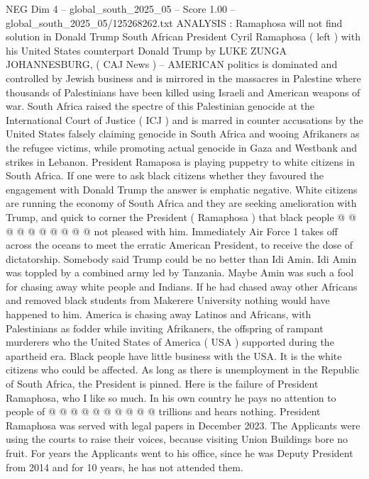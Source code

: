 \begin{textsample}{NEG Dim 4 – global\_south\_2025\_05 – Score 1.00 – global\_south\_2025\_05/125268262.txt}  \label{ex:f4_neg_364}
ANALYSIS : Ramaphosa will not find solution in Donald Trump South African President Cyril Ramaphosa ( left ) with his United States counterpart Donald Trump by LUKE ZUNGA JOHANNESBURG, ( CAJ News ) -- AMERICAN politics is dominated and controlled by Jewish business and is mirrored in the massacres in Palestine where thousands of Palestinians have been killed using Israeli and American weapons of war.
South Africa raised the spectre of this Palestinian genocide at the International Court of Justice ( ICJ ) and is marred in counter accusations by the United States falsely claiming genocide in South Africa and wooing Afrikaners as the refugee victims, while promoting actual genocide in Gaza and Westbank and strikes in Lebanon.
President Ramaposa is playing puppetry to white citizens in South Africa.
If one were to ask black citizens whether they favoured the engagement with Donald Trump the answer is emphatic negative.
White citizens are running the economy of South Africa and they are seeking amelioration with Trump, and quick to corner the President ( Ramaphosa ) that black people @ @ @ @ @ @ @ @ @ @ not pleased with him.
Immediately Air Force 1 takes off across the oceans to meet the erratic American President, to receive the dose of dictatorship.
Somebody said Trump could be no better than Idi Amin.
Idi Amin was toppled by a combined army led by Tanzania.
Maybe Amin was such a fool for chasing away white people and Indians.
If he had chased away other Africans and removed black students from Makerere University nothing would have happened to him.
America is chasing away Latinos and Africans, with Palestinians as fodder while inviting Afrikaners, the offspring of rampant murderers who the United States of America ( USA ) supported during the apartheid era.
Black people have little business with the USA.
It is the white citizens who could be affected.
As long as there is unemployment in the Republic of South Africa, the President is pinned.
Here is the failure of President Ramaphosa, who I like so much.
In his own country he pays no attention to people of @ @ @ @ @ @ @ @ @ @ trillions and hears nothing.
President Ramaphosa was served with legal papers in December 2023.
The Applicants were using the courts to raise their voices, because visiting Union Buildings bore no fruit.
For years the Applicants went to his office, since he was Deputy President from 2014 and for 10 years, he has not attended them.

\end{textsample}
